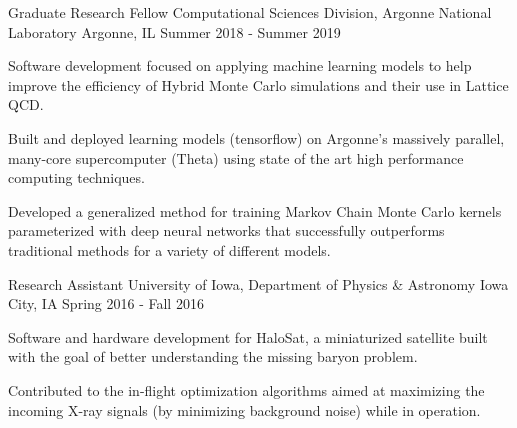 \vspace{-1.75ex}

\begin{cventries}

  \cventry
  {Graduate Research Fellow} %
  {Computational Sciences Division, Argonne National Laboratory} %
  {Argonne, IL} %
  {Summer 2018 - Summer 2019} %
  {
      \begin{cvitems} %
          \item {Software development focused on applying machine learning
                  models to help improve the efficiency of Hybrid Monte Carlo 
                  simulations and their use in Lattice QCD.}
          \item {Built and deployed learning models (tensorflow) on Argonne's
                  massively parallel, many-core supercomputer (Theta) using
                  state of the art high performance computing techniques.}
          \item {Developed a generalized method for training Markov Chain Monte
                  Carlo kernels parameterized with deep neural networks that
                  successfully outperforms traditional methods for a variety of
              different models.}
      \end{cvitems}
  }

\cventry
  {Research Assistant} %
  {University of Iowa, Department of Physics \& Astronomy} %
  {Iowa City, IA} %
  {Spring 2016 - Fall 2016} %
  {
      \begin{cvitems} %
          \item {Software and hardware development for HaloSat, a miniaturized
                  satellite built with the goal of better understanding the
                  missing baryon problem.}
          \item {Contributed to the in-flight optimization algorithms aimed at
                  maximizing the incoming X-ray signals (by minimizing
                  background noise) while in operation.}
      \end{cvitems}
  }


\end{cventries}
